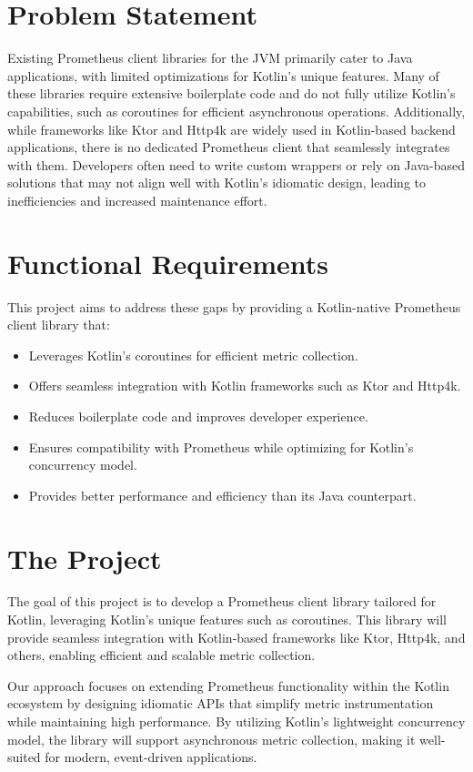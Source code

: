 \documentclass[a4paper,twoside,11pt]{article}
\begin{document}
\section{Problem Statement}
Existing Prometheus client libraries for the JVM primarily cater to Java applications, with limited optimizations for Kotlin’s unique features. Many of these libraries require extensive boilerplate code and do not fully utilize Kotlin’s capabilities, such as coroutines for efficient asynchronous operations.
Additionally, while frameworks like Ktor and Http4k are widely used in Kotlin-based backend applications, there is no dedicated Prometheus client that seamlessly integrates with them. Developers often need to write custom wrappers or rely on Java-based solutions that may not align well with Kotlin’s idiomatic design, leading to inefficiencies and increased maintenance effort.

\section{Functional Requirements}
This project aims to address these gaps by providing a Kotlin-native Prometheus client library that:
\begin{itemize}
    \item Leverages Kotlin’s coroutines for efficient metric collection.
    \item Offers seamless integration with Kotlin frameworks such as Ktor and Http4k.
    \item Reduces boilerplate code and improves developer experience.
    \item Ensures compatibility with Prometheus while optimizing for Kotlin’s concurrency model.
    \item Provides better performance and efficiency than its Java counterpart.
\end{itemize}

\section{The Project}
The goal of this project is to develop a Prometheus client library tailored for Kotlin, leveraging Kotlin's unique features such as coroutines. This library will provide seamless integration with Kotlin-based frameworks like Ktor, Http4k, and others, enabling efficient and scalable metric collection.

Our approach focuses on extending Prometheus functionality within the Kotlin ecosystem by designing idiomatic APIs that simplify metric instrumentation while maintaining high performance. By utilizing Kotlin’s lightweight concurrency model, the library will support asynchronous metric collection, making it well-suited for modern, event-driven applications.
\end{document}
